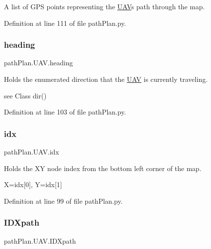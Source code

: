 A list of G\+PS points representing the \mbox{\hyperlink{classpath_plan_1_1_u_a_v}{U\+AV}}\textquotesingle{}s path through the map. 



Definition at line 111 of file path\+Plan.\+py.

\mbox{\label{classpath_plan_1_1_u_a_v_ac49fa37a2aaf8fe987f1500069c4f903}} 
\subsubsection{\texorpdfstring{heading}{heading}}
{\footnotesize\ttfamily path\+Plan.\+U\+A\+V.\+heading}



Holds the enumerated direction that the \mbox{\hyperlink{classpath_plan_1_1_u_a_v}{U\+AV}} is currently traveling. 

see Class dir() 

Definition at line 103 of file path\+Plan.\+py.

\mbox{\label{classpath_plan_1_1_u_a_v_a8c6578c4b96f4704489038660a4ebe58}} 
\subsubsection{\texorpdfstring{idx}{idx}}
{\footnotesize\ttfamily path\+Plan.\+U\+A\+V.\+idx}



Holds the XY node index from the bottom left corner of the map. 

X=idx\mbox{[}0\mbox{]}, Y=idx\mbox{[}1\mbox{]} 

Definition at line 99 of file path\+Plan.\+py.

\mbox{\label{classpath_plan_1_1_u_a_v_a640c0f9f8385d53e0742d9ef5f3a7a59}} 
\subsubsection{\texorpdfstring{I\+D\+Xpath}{IDXpath}}
{\footnotesize\ttfamily path\+Plan.\+U\+A\+V.\+I\+D\+Xpath}



